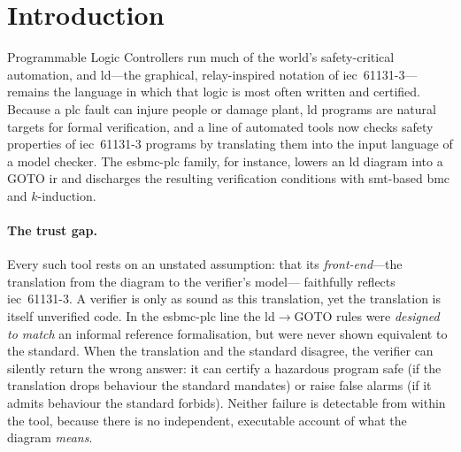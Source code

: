 \providecommand{\kld}{\textsc{K-LD}}
\providecommand{\kst}{\textsc{K-ST}}

\section{Introduction}
\label{sec:intro}

Programmable Logic Controllers run much of the world's safety-critical
automation, and \gls{ld}---the graphical, relay-inspired notation of
\gls{iec}~61131-3---remains the language in which that logic is most often
written and certified. Because a \gls{plc} fault can injure people or damage
plant, \gls{ld} programs are natural targets for formal verification, and a line
of automated tools now checks safety properties of \gls{iec}~61131-3 programs by
translating them into the input language of a model checker. The
\gls{esbmc}-\gls{plc} family, for instance, lowers an \gls{ld} diagram into a
GOTO \gls{ir} and discharges the resulting verification conditions with
\gls{smt}-based \gls{bmc} and $k$-induction.

\paragraph{The trust gap.} Every such tool rests on an unstated assumption: that
its \emph{front-end}---the translation from the diagram to the verifier's model---
faithfully reflects \gls{iec}~61131-3. A verifier is only as sound as this
translation, yet the translation is itself unverified code. In the
\gls{esbmc}-\gls{plc} line the \gls{ld}$\rightarrow$GOTO rules were \emph{designed
to match} an informal reference formalisation, but were never shown equivalent to
the standard. When the translation and the standard disagree, the verifier can
silently return the wrong answer: it can certify a hazardous program safe (if the
translation drops behaviour the standard mandates) or raise false alarms (if it
admits behaviour the standard forbids). Neither failure is detectable from within
the tool, because there is no independent, executable account of what the diagram
\emph{means}.


